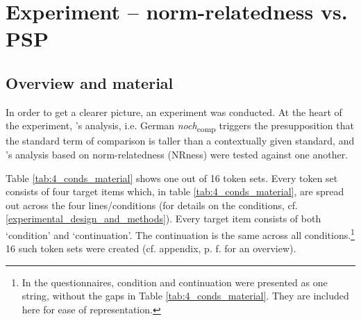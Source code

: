 \documentclass[output=paper,
modfonts
]{langscibook}
\begin{document}
\section{Experiment -- norm-relatedness vs. PSP}\label{sec_experiment}
\subsection{Overview and material}

In order to get a clearer picture, an experiment was conducted. At the heart of the experiment, \citeauthor{Hofstetter2013}'s \citeyearpar{Hofstetter2013} analysis, i.e. German \textit{noch}\textsubscript{comp} triggers the presupposition that the standard term of comparison is taller than a contextually given standard, and \citeauthor{umbach2009a_comp}'s \citeyearpar{umbach2009a_comp} analysis based on norm-relatedness (NRness) were tested against one another.

Table \ref{tab:4_conds_material} shows one out of 16 token sets. Every token set consists of four target items which, in table \ref{tab:4_conds_material}, are spread out across the four lines/conditions (for details on the conditions, cf. \ref{experimental_design_and_methods}). Every target item consists of both `condition' and `continuation'. The continuation is the same across all conditions.\footnote{In the questionnaires, condition and continuation were presented as one string, without the gaps in Table \ref{tab:4_conds_material}. They are included here for ease of representation.} 16 such token sets were created (cf. appendix, p. \pageref{tab:16_contexts}f. for an overview).
\end{document}
